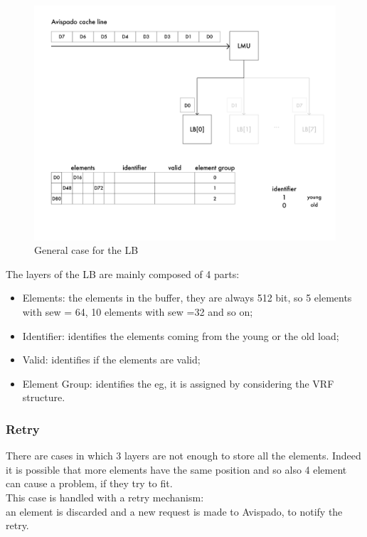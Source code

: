 \begin{figure}[H]
    \centering
    \includegraphics[scale = 0.4]{Chapter_2/img/cache-to-lb-genz-ex.png}
    \caption{General case for the LB}
    \label{lb-genz}
\end{figure}

The layers of the LB are mainly composed of 4 parts:
\begin{itemize}
    \item Elements: the elements in the buffer, they are always 512 bit, so 5 elements with sew = 64, 10 elements with sew =32 and so on;
    
    \item Identifier: identifies the elements coming from the young or the old load;
    
    \item Valid: identifies if the elements are valid;
    
    \item Element Group: identifies the eg, it is assigned by considering the VRF structure.
\end{itemize}

\subsubsection{Retry}
There are cases in which 3 layers are not enough to store all the elements. Indeed it is possible that more elements have the same position and so also 4 element can cause a problem, if they try to fit.\\

This case is handled with a retry mechanism:\\
an element is discarded and a new request is made to Avispado, to  notify the retry.\\

